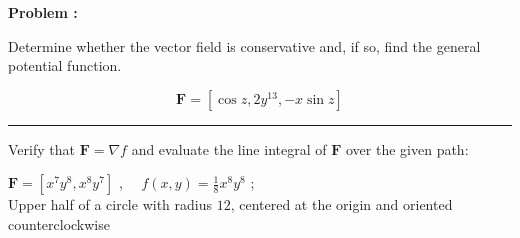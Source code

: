 {\bf Problem :}

Determine whether the vector field is conservative and, if so, find the
general potential function.
\par 
\[\mathbf{F} = \left[ \cos z ,2 y^{13}, -x\sin z\right]\]

\medskip\goodbreak\hrule\nobreak\smallskip

Verify that \(\mathbf{F}=\nabla f\) and evaluate the line integral of
\(\mathbf{F}\) over the given path:
\par 
\(\mathbf{F} = \left[x^{7}y^{8},x^{8}y^{7}\right]\) , \(\quad f(x,y)=\frac1{8}x^{8}y^{8}\) ; \leavevmode\\\relax  
Upper half of a circle with radius \(12\), centered at the origin and oriented counterclockwise
